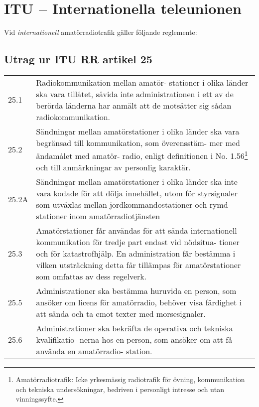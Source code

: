 \section{ITU -- Internationella teleunionen}

Vid \emph{internationell} amatörradiotrafik gäller följande reglemente:

\subsection{Utrag ur ITU RR artikel 25}

\begin{tabularx}{\columnwidth}{lX}
	25.1 & Radiokommunikation mellan amatör-
	stationer i olika länder ska vara
	tillåtet, såvida inte administrationen
	i ett av de berörda länderna har
	anmält att de motsätter sig sådan
	radiokommunikation.\vspace{1ex}\\
	
	25.2 & Sändningar mellan amatörstationer
	i olika länder ska vara begränsad till
	kommunikation, som överensstäm-
	mer med ändamålet med amatör-
	radio, enligt definitionen i No. 1.56\footnote{%
		Amatörradiotrafik:
		Icke yrkesmässig radiotrafik för
		övning, kommunikation och tekniska 
		undersökningar, bedriven
		i personligt intresse och utan
		vinningssyfte.}
	och till anmärkningar av personlig
	karaktär.\vspace{1ex}\\
	
	25.2A & Sändningar mellan amatörstationer
	i olika länder ska inte vara kodade
	för att dölja innehållet, utom för
	styrsignaler som utväxlas mellan
	jordkommandostationer och rymd-
	stationer inom amatörradiotjänsten\vspace{1ex}\\
	
	25.3 &Amatörstationer får användas för att
	sända internationell kommunikation
	för tredje part endast vid nödsitua-
	tioner och för katastrofhjälp. En
	administration får bestämma i vilken
	utsträckning detta får tillämpas för
	amatörstationer som omfattas av
	dess regelverk.\vspace{1ex}\\
	
	25.5 &Administrationer ska bestämma
	huruvida en person, som ansöker
	om licens för amatörradio, behöver
	visa färdighet i att sända och ta
	emot texter med morsesignaler.\vspace{1ex}\\
	
	25.6 & Administrationer ska bekräfta de
	operativa och tekniska kvalifikatio-
	nerna hos en person, som ansöker
	om att få använda en amatörradio-
	station.\vspace{1ex}\\



\end{tabularx}	

